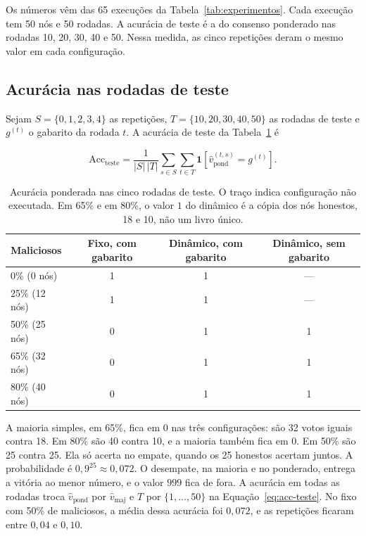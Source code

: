 \documentclass[12pt]{article}
\begin{document}
Os números vêm das 65 execuções da Tabela~\ref{tab:experimentos}. Cada execução tem 50 nós e 50 rodadas. A acurácia de teste é a do consenso ponderado nas rodadas 10, 20, 30, 40 e 50. Nessa medida, as cinco repetições deram o mesmo valor em cada configuração.

\subsection{Acurácia nas rodadas de teste}

Sejam $S = \{0,1,2,3,4\}$ as repetições, $T = \{10, 20, 30, 40, 50\}$ as rodadas de teste e $g^{(t)}$ o gabarito da rodada $t$. A acurácia de teste da Tabela~\ref{tab:teste} é

\begin{equation}
\label{eq:acc-teste}
\mathrm{Acc}_{\mathrm{teste}}
= \frac{1}{|S|\,|T|}
\sum_{s \in S}\sum_{t \in T}
\mathbf{1}\!\left[\hat{v}_{\mathrm{pond}}^{(t,s)} = g^{(t)}\right].
\end{equation}

\begin{table}[htbp]
\centering
\caption{Acurácia ponderada nas cinco rodadas de teste. O traço indica configuração não executada. Em 65\% e em 80\%, o valor $1$ do dinâmico é a cópia dos nós honestos, 18 e 10, não um livro único.}
\label{tab:teste}
\footnotesize
\begin{tabular}{|l|c|c|c|}
\hline
\textbf{Maliciosos} & \textbf{Fixo, com gabarito} & \textbf{Dinâmico, com gabarito} & \textbf{Dinâmico, sem gabarito} \\
\hline
0\% (0 nós)  & 1 & 1 & --- \\
25\% (12 nós) & 1 & 1 & --- \\
50\% (25 nós) & 0 & 1 & 1 \\
65\% (32 nós) & 0 & 1 & 1 \\
80\% (40 nós) & 0 & 1 & 1 \\
\hline
\end{tabular}
\end{table}

A maioria simples, em 65\%, fica em $0$ nas três configurações: são 32 votos iguais contra 18. Em 80\% são 40 contra 10, e a maioria também fica em $0$. Em 50\% são 25 contra 25. Ela só acerta no empate, quando os 25 honestos acertam juntos. A probabilidade é $0{,}9^{25} \approx 0{,}072$. O desempate, na maioria e no ponderado, entrega a vitória ao menor número, e o valor $999$ fica de fora. A acurácia em todas as rodadas troca $\hat{v}_{\mathrm{pond}}$ por $\hat{v}_{\mathrm{maj}}$ e $T$ por $\{1,\ldots,50\}$ na Equação~\ref{eq:acc-teste}. No fixo com 50\% de maliciosos, a média dessa acurácia foi $0{,}072$, e as repetições ficaram entre $0{,}04$ e $0{,}10$.
\end{document}
